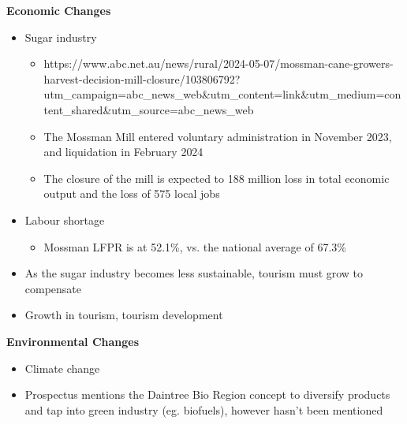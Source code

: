 	\textbf{Economic Changes}
		\begin{itemize}
			\item Sugar industry
				\begin{itemize}
					\item https://www.abc.net.au/news/rural/2024-05-07/mossman-cane-growers-harvest-decision-mill-closure/103806792?utm_campaign=abc_news_web&utm_content=link&utm_medium=content_shared&utm_source=abc_news_web
					\item The Mossman Mill entered voluntary administration in November 2023, and liquidation in February 2024
					\item The closure of the mill is expected to 188 million loss in total economic output and the loss of 575 local jobs
				\end{itemize}
			\item Labour shortage
				\begin{itemize}
					\item Mossman LFPR is at 52.1\%, vs. the national average of 67.3\%
				\end{itemize}
			\item As the sugar industry becomes less sustainable, tourism must grow to compensate
			\item Growth in tourism, tourism development
		\end{itemize}

	\textbf{Environmental Changes}
		\begin{itemize}
			\item Climate change
			\item Prospectus mentions the Daintree Bio Region concept to diversify products and tap into green industry (eg. biofuels), however hasn't been mentioned
		\end{itemize}

